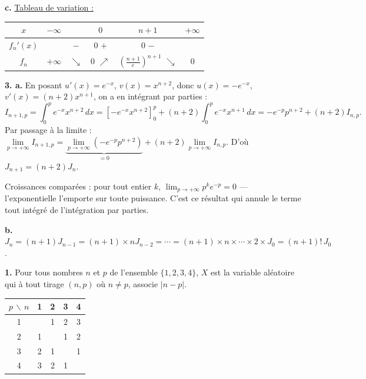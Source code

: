 \documentclass[11pt]{article}
\begin{document}
\textbf{c.} \underline{Tableau de variation :}
\begin{center}\renewcommand{\arraystretch}{1.4}
\begin{tabular}{|c|ccccc|}
\hline
$x$ & $-\infty$ & & $0$ & $n+1$ & $+\infty$ \\
\hline
$f_n'(x)$ & & $-$ & $0$ \quad $+$ & $0$ \quad $-$ & \\
\hline
$f_n$ & $+\infty$ & $\searrow$ & $0$ \;$\nearrow$\; & $\left(\frac{n+1}{e}\right)^{n+1}$ $\searrow$ & $0$ \\
\hline
\end{tabular}
\end{center}

\textbf{3. a.} En posant $u'(x) = e^{-x}$, $v(x) = x^{n+2}$, donc $u(x) = -e^{-x}$, $v'(x) = (n+2)x^{n+1}$, on a en intégrant par parties :
\[ I_{n+1,p} = \int_0^p e^{-x}x^{n+2}\,dx = \left[-e^{-x}x^{n+2}\right]_0^p + (n+2)\int_0^p e^{-x}x^{n+1}\,dx = -e^{-p}p^{n+2} + (n+2)I_{n,p}. \]
Par passage à la limite : $\lim\limits_{p\to+\infty} I_{n+1,p} = \underbrace{\lim\limits_{p\to+\infty}(-e^{-p}p^{n+2})}_{=0} + (n+2)\lim\limits_{p\to+\infty} I_{n,p}$. D'où $J_{n+1} = (n+2)J_n$.

\begin{rappel}
Croissances comparées : pour tout entier $k$,
$\lim_{p\to+\infty} p^k e^{-p} = 0$ — l'exponentielle l'emporte sur
toute puissance. C'est ce résultat qui annule le terme tout intégré de
l'intégration par parties.
\end{rappel}

\textbf{b.} $J_n = (n+1)J_{n-1} = (n+1) \times n J_{n-2} = \cdots = (n+1) \times n \times \cdots \times 2 \times J_0 = (n+1)!\,J_0$.


\textbf{1.} Pour tous nombres $n$ et $p$ de l'ensemble $\{1, 2, 3, 4\}$, $X$ est la variable aléatoire qui à tout tirage $(n, p)$ où $n \ne p$, associe $|n - p|$.
\begin{center}\renewcommand{\arraystretch}{1.3}
\begin{tabular}{|c|c|c|c|c|}
\hline
$p\,\backslash\,n$ & 1 & 2 & 3 & 4 \\
\hline
1 & & 1 & 2 & 3 \\
\hline
2 & 1 & & 1 & 2 \\
\hline
3 & 2 & 1 & & 1 \\
\hline
4 & 3 & 2 & 1 & \\
\hline
\end{tabular}
\end{center}
\end{document}
